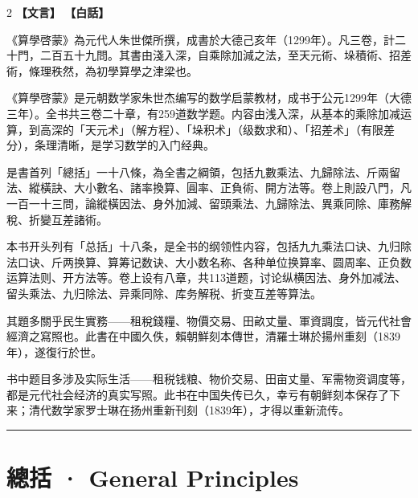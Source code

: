 \documentclass[11pt,a4paper]{article}
\newcommand{\longline}{\noindent\rule{\textwidth}{0.4pt}}
\begin{document}
\begin{paracol}{2}
\noindent\textbf{\textcolor{leftlabel}{【文言】}}
\switchcolumn
\noindent\textbf{\textcolor{rightlabel}{【白話】}}
\switchcolumn*

《算學啓蒙》為元代人朱世傑所撰，成書於大德己亥年（1299年）。凡三卷，計二十門，二百五十九問。其書由淺入深，自乘除加減之法，至天元術、垛積術、招差術，條理秩然，為初學算學之津梁也。

\switchcolumn

《算學啓蒙》是元朝数学家朱世杰编写的数学启蒙教材，成书于公元1299年（大德三年）。全书共三卷二十章，有259道数学题。内容由浅入深，从基本的乘除加减运算，到高深的「天元术」（解方程）、「垛积术」（级数求和）、「招差术」（有限差分），条理清晰，是学习数学的入门经典。

\switchcolumn*

是書首列「總括」一十八條，為全書之綱領，包括九數乘法、九歸除法、斤兩留法、縱橫訣、大小數名、諸率換算、圓率、正負術、開方法等。卷上則設八門，凡一百一十三問，論縱橫因法、身外加減、留頭乘法、九歸除法、異乘同除、庫務解稅、折變互差諸術。

\switchcolumn

本书开头列有「总括」十八条，是全书的纲领性内容，包括九九乘法口诀、九归除法口诀、斤两换算、算筹记数诀、大小数名称、各种单位换算率、圆周率、正负数运算法则、开方法等。卷上设有八章，共113道题，讨论纵横因法、身外加减法、留头乘法、九归除法、异乘同除、库务解税、折变互差等算法。

\switchcolumn*

其題多關乎民生實務——租稅錢糧、物價交易、田畝丈量、軍資調度，皆元代社會經濟之寫照也。此書在中國久佚，賴朝鮮刻本傳世，清羅士琳於揚州重刻（1839年），遂復行於世。

\switchcolumn

书中题目多涉及实际生活——租税钱粮、物价交易、田亩丈量、军需物资调度等，都是元代社会经济的真实写照。此书在中国失传已久，幸亏有朝鲜刻本保存了下来；清代数学家罗士琳在扬州重新刊刻（1839年），才得以重新流传。

\end{paracol}

\longline

\newpage
\section{總括 · General Principles}
\label{sec:zongguo}
\end{document}
